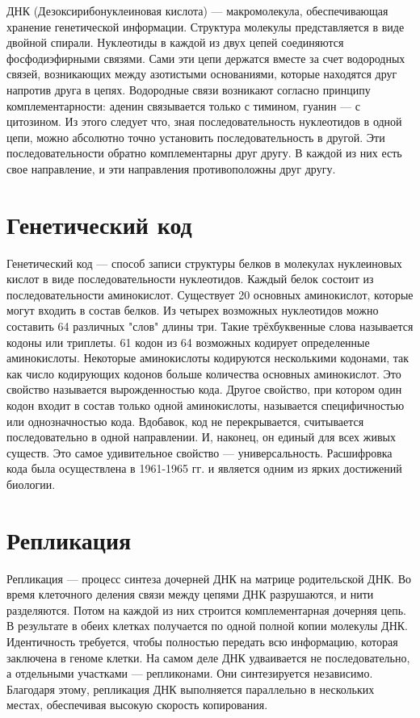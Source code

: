 ДНК (Дезоксирибонуклеиновая кислота) — макромолекула, обеспечивающая хранение генетической информации. Структура молекулы представляется в виде двойной спирали. Нуклеотиды в каждой из двух цепей соединяются фосфодиэфирными связями. Сами эти цепи держатся вместе за счет водородных связей, возникающих между азотистыми основаниями, которые находятся друг напротив друга в цепях. Водородные связи возникают согласно принципу комплементарности: аденин связывается только с тимином, гуанин — с цитозином. Из этого следует что, зная последовательность нуклеотидов в одной цепи,  можно абсолютно точно установить последовательность в другой. 
Эти последовательности обратно комплементарны друг другу. В каждой из них есть свое направление, и эти направления противоположны друг другу.

\section {Генетический код}

Генетический код — способ записи структуры белков в молекулах нуклеиновых кислот в виде последовательности нуклеотидов. Каждый белок состоит из последовательности аминокислот. Существует 20 основных аминокислот, которые могут входить в состав белков. Из четырех возможных нуклеотидов можно составить 64 различных "слов" длины три. Такие трёхбуквенные слова называется кодоны или триплеты. 61 кодон из 64 возможных кодирует определенные аминокислоты. Некоторые аминокислоты кодируются несколькими кодонами, так как число кодирующих кодонов больше количества основных аминокислот. Это свойство называется вырожденностью кода. Другое свойство, при котором один кодон входит в состав только одной аминокислоты, называется специфичностью или однозначностью кода. Вдобавок, код не перекрывается, считывается последовательно в одной направлении. И, наконец, он единый для всех живых существ. Это самое удивительное свойство — универсальность. Расшифровка кода была осуществлена в 1961-1965 гг. и является одним из ярких достижений биологии.

\section {Репликация}
Репликация — процесс синтеза дочерней ДНК на матрице родительской ДНК. Во время клеточного деления связи между цепями ДНК разрушаются, и нити разделяются. Потом на каждой из них строится комплементарная дочерняя цепь. В результате в обеих клетках получается по одной полной копии молекулы ДНК. Идентичность требуется, чтобы полностью передать всю информацию, которая заключена в геноме клетки. На самом деле ДНК удваивается не последовательно, а отдельными участками  — репликонами. Они синтезируется независимо. Благодаря этому, репликация ДНК выполняется параллельно в нескольких местах, обеспечивая высокую скорость копирования.  

